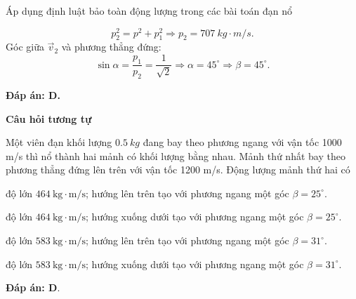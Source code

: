 \begin{dang}{Áp dụng định luật bảo toàn động lượng trong các bài toán đạn nổ}
{		
		\begin{equation*}
			p^2_2 =p^2+p^2_1 \Rightarrow p_2  =\SI{707}{kg \cdot m/s}.
		\end{equation*}
		Góc giữa $\vec v_2$ và phương thẳng đứng: 
		\begin{equation*}
			\sin \alpha = \dfrac{p_1}{p_2} = \dfrac{1}{\sqrt 2} \Rightarrow \alpha = 45^\circ \Rightarrow \beta = 45^\circ.
		\end{equation*}
		
		\textbf{Đáp án: D.}
		
		\begin{center}
			\textbf{Câu hỏi tương tự}
		\end{center}
		
		Một viên đạn khối lượng $\SI{0.5}{kg}$ đang bay theo phương ngang với vận tốc 1000 m/s thì nổ thành hai mảnh có khối lượng bằng nhau. Mảnh thứ nhất bay theo phương thẳng đứng lên trên với vận tốc 1200 m/s. Động lượng mảnh thứ hai có
		\begin{mcq}
			\item độ lớn $464\ \text{kg} \cdot \text{m/s}$; hướng lên trên tạo với phương ngang một góc $\beta= 25^\circ$.
			\item độ lớn $464\ \text{kg} \cdot \text{m/s}$; hướng xuống dưới tạo với phương ngang một góc $\beta= 25^\circ$. 
			\item độ lớn $583\ \text{kg} \cdot \text{m/s}$; hướng lên trên tạo với phương ngang một góc $\beta= 31^\circ$. 
			\item độ lớn $583\ \text{kg} \cdot \text{m/s}$; hướng xuống dưới tạo với phương ngang một góc $\beta= 31^\circ$.
		\end{mcq}
		
		\textbf{Đáp án: D}.
	}
	
\end{dang}

